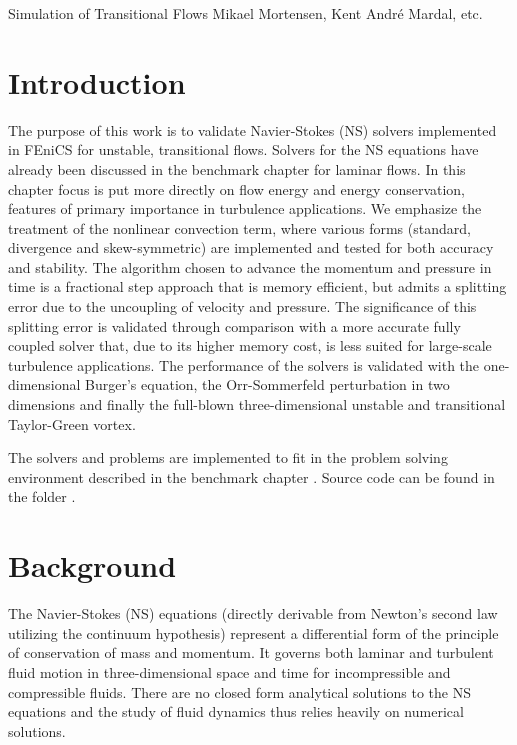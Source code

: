               {Simulation of Transitional Flows}
              {Mikael Mortensen, Kent Andr\'{e} Mardal, etc.}

\newcommand{\Hset}{FIXME: This is undefined!}
\newcommand{\Nset}{FIXME: This is undefined!}


\section{Introduction}

The purpose of this work is to validate Navier-Stokes (NS) solvers
implemented in FEniCS for unstable, transitional flows. Solvers for
the NS equations have already been discussed in the benchmark
chapter \cite{nsbench} for laminar flows. In this chapter focus is put
more directly on flow energy and energy conservation, features of
primary importance in turbulence applications. We emphasize the
treatment of the nonlinear convection term, where various forms
(standard, divergence and skew-symmetric) are implemented and tested
for both accuracy and stability. The algorithm chosen to advance the
momentum and pressure in time is a fractional step approach that is
memory efficient, but admits a splitting error due to the uncoupling
of velocity and pressure. The significance of this splitting error is
validated through comparison with a more accurate fully coupled solver
that, due to its higher memory cost, is less suited for large-scale
turbulence applications. The performance of the solvers is validated
with the one-dimensional Burger's equation, the Orr-Sommerfeld
perturbation in two dimensions and finally the full-blown
three-dimensional unstable and transitional Taylor-Green vortex.

The solvers and problems are implemented to fit in the problem solving
environment described in the benchmark chapter \cite{nsbench}. Source
code can be found in the folder \cite{folder}.

\section{Background}

The Navier-Stokes (NS) equations (directly derivable from Newton's
second law utilizing the continuum hypothesis) represent a
differential form of the principle of conservation of mass and
momentum. It governs both laminar and turbulent fluid motion in
three-dimensional space and time for incompressible and compressible
fluids. There are no closed form analytical solutions to the NS
equations and the study of fluid dynamics thus relies heavily on
numerical solutions.

